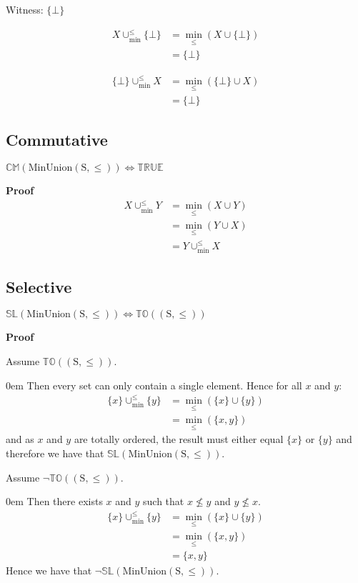\documentclass[10pt]{article}
\newcommand{\propname}[1]{{\mathbb{#1}}}
\newcommand{\minunion}{\cup_{\min}^{\leq}}
\newcommand{\proof}{\vspace{1em} \textbf{Proof} \vspace{1em}}
\newenvironment{ind}[0]{\begin{addmargin}[1em]{0em}\vspace{0.5em}}{\end{addmargin}\vspace{0.5em}}
\begin{document}
Witness: $\{\bot\}$

\begin{align*}
X \minunion \{\bot\} 	& = \min_\leq(X \cup \{\bot\}) \\
						& = \{\bot\}
\end{align*}

\begin{align*}
\{\bot\} \minunion X 	& = \min_\leq(\{\bot\} \cup X) \\
						& = \{\bot\}
\end{align*}



\subsection{Commutative}

$\propname{CM}(\mathrm{MinUnion(S,\leq)}) \Leftrightarrow \propname{TRUE}$

\proof
\begin{align*}
X \minunion Y 	& = \min_\leq(X \cup Y) \\
				& = \min_\leq(Y \cup X) \\
				& = Y \minunion X
\end{align*}



\subsection{Selective}

$\propname{SL}(\mathrm{MinUnion(S,\leq)}) \Leftrightarrow \propname{TO}(\mathrm{(S,\leq)})$

\proof

Assume $\propname{TO}(\mathrm{(S,\leq)})$.

\begin{ind}
Then every set can only contain a single element. Hence for all $x$ and $y$:
\begin{align*}
\{ x \} \minunion \{ y \} 	& = \min_\leq(\{ x \} \cup \{ y \}) \\
							& = \min_\leq(\{ x , y \}) 
\end{align*}
and as $x$ and $y$ are totally ordered, the result must either equal $\{ x \}$ or $\{ y \}$ and therefore we have that $\propname{SL}(\mathrm{MinUnion(S,\leq)})$.
\end{ind}

Assume $\neg \propname{TO}(\mathrm{(S,\leq)})$.

\begin{ind}
Then there exists $x$ and $y$ such that $x \nleq y$ and $y \nleq x$.
\begin{align*}
\{ x \} \minunion \{ y \} 	& = \min_\leq(\{ x \} \cup \{ y \}) \\
							& = \min_\leq(\{ x , y \}) \\
							& = \{ x , y \}
\end{align*}
Hence we have that $\neg \propname{SL}(\mathrm{MinUnion(S,\leq)})$.
\end{ind}
\end{document}
